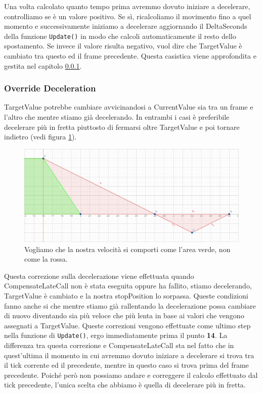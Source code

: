 \documentclass[main.tex]{subfiles}
\begin{document}
\noindent Una volta calcolato quanto tempo prima avremmo dovuto iniziare a decelerare, controlliamo se è un valore positivo. Se sì, ricalcoliamo il movimento fino a quel momento e successivamente iniziamo a decelerare aggiornando il DeltaSeconds della funzione \lstinline{Update()} in modo che calcoli automaticamente il resto dello spostamento. \newline
Se invece il valore risulta negativo, vuol dire che TargetValue è cambiato tra questo ed il frame precedente. Questa casistica viene approfondita e gestita nel capitolo  \ref{subsubsec:4_2_OverrideDeceleration}.


\subsubsection{Override Deceleration}\label{subsubsec:4_2_OverrideDeceleration}
TargetValue potrebbe cambiare avvicinandosi a CurrentValue sia tra un frame e l'altro che mentre stiamo già decelerando. In entrambi i casi è preferibile decelerare più in fretta piuttosto di fermarsi oltre TargetValue e poi tornare indietro (vedi figura \ref{fig:4_OverrideDecelIntro}).
\begin{figure}[H]
    \centering
    \includegraphics[width=.95\linewidth]{img/interpolazione/OverrideDecelIntro.png}
    \caption{Vogliamo che la nostra velocità si comporti come l'area verde, non come la rossa.}
    \label{fig:4_OverrideDecelIntro}
\end{figure}
\noindent Questa correzione sulla decelerazione viene effettuata quando CompensateLateCall non è stata eseguita oppure ha fallito, stiamo decelerando, TargetValue è cambiato e la nostra stopPosition lo sorpassa. Queste condizioni fanno anche si che mentre stiamo già rallentando la decelerazione possa cambiare di nuovo diventando sia più veloce che più lenta in base ai valori che vengono assegnati a TargetValue. Queste correzioni vengono effettuate come ultimo step nella funzione di \lstinline{Update()}, ergo immediatamente prima il punto \textbf{14}. \newline
La differenza tra questa correzione e CompensateLateCall sta nel fatto che in quest'ultima il momento in cui avremmo dovuto iniziare a decelerare si trova tra il tick corrente ed il precedente, mentre in questo caso si trova prima del frame precedente. Poiché però non possiamo andare  e correggere il calcolo effettuato dal tick precedente, l'unica scelta che abbiamo è quella di decelerare più in fretta.\newline
\end{document}

